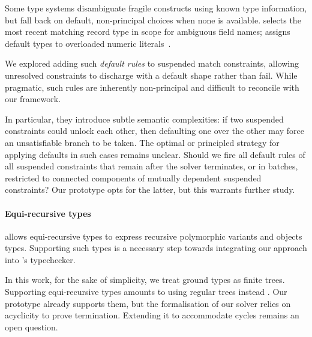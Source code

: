 \documentclass[acmsmall,screen,nonacm,review]{acmart}
\begin{document}
Some type systems disambiguate fragile constructs using known type information,
but fall back on default, non-principal choices when none is available. \OCaml
selects the most recent matching record type in scope for ambiguous field
names; \SML assigns default types to overloaded numeric
literals~\citep*[Section 5.8]{rossberg-hamlet}.

We explored adding such \emph{default rules} to suspended match constraints,
allowing unresolved constraints to discharge with a default shape rather than
fail. While pragmatic, such rules are inherently non-principal and difficult to
reconcile with our framework.

In particular, they introduce subtle semantic complexities: if two suspended
constraints could unlock each other, then defaulting one over the other
may force an unsatisfiable branch to be taken.
The optimal or principled strategy for applying defaults in such cases
remains unclear.
Should we fire all default rules of all suspended constraints
that remain after the solver terminates, or in batches, restricted to connected
components of mutually dependent suspended constraints?
Our prototype opts for the latter, but this warrants further study.

%

\paragraph{Equi-recursive types}
\label {sec/rec-types}

\OCaml allows equi-recursive types to express recursive polymorphic variants
and objects types. Supporting such types is a necessary step towards integrating
our approach into \OCaml's typechecker.

In this work, for the sake of simplicity, we treat ground types as finite
trees. Supporting equi-recursive types amounts to using regular trees instead
\citep*{Pottier-Remy/emlti}. Our prototype already supports them,
but the formalisation of our solver relies on acyclicity to prove termination.
Extending it to accommodate cycles remains an open question.
\end{document}
